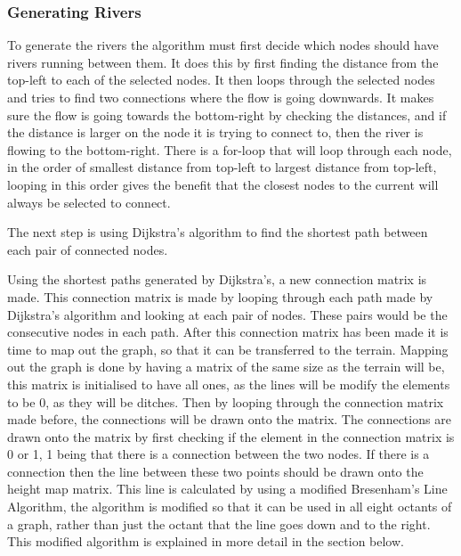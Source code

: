 \subsubsection{Generating Rivers}
	To generate the rivers the algorithm must first decide which nodes should have rivers running between them. It does this by first finding the distance from the top-left to each of the selected nodes. It then loops through the selected nodes and tries to find two connections where the flow is going downwards. It makes sure the flow is going towards the bottom-right by checking the distances, and if the distance is larger on the node it is trying to connect to, then the river is flowing to the bottom-right. There is a for-loop that will loop through each node, in the order of smallest distance from top-left to largest distance from top-left, looping in this order gives the benefit that the closest nodes to the current will always be selected to connect.


	The next step is using Dijkstra's algorithm to find the shortest path between each pair of connected nodes.
	\newline
	\par
	
	Using the shortest paths generated by Dijkstra's, a new connection matrix is made. This connection matrix is made by looping through each path made by Dijkstra's algorithm and looking at each pair of nodes. These pairs would be the consecutive nodes in each path. After this connection matrix has been made it is time to map out the graph, so that it can be transferred to the terrain. Mapping out the graph is done by having a matrix of the same size as the terrain will be, this matrix is initialised to have all ones, as the lines will be modify the elements to be 0, as they will be ditches. Then by looping through the connection matrix made before, the connections will be drawn onto the matrix. The connections are drawn onto the matrix by first checking if the element in the connection matrix is 0 or 1, 1 being that there is a connection between the two nodes. If there is a connection then the line between these two points should be drawn onto the height map matrix. This line is calculated by using a modified Bresenham's Line Algorithm, the algorithm is modified so that it can be used in all eight octants of a graph, rather than just the octant that the line goes down and to the right. This modified algorithm is explained in more detail in the section below.
	\newline
	\par
	
